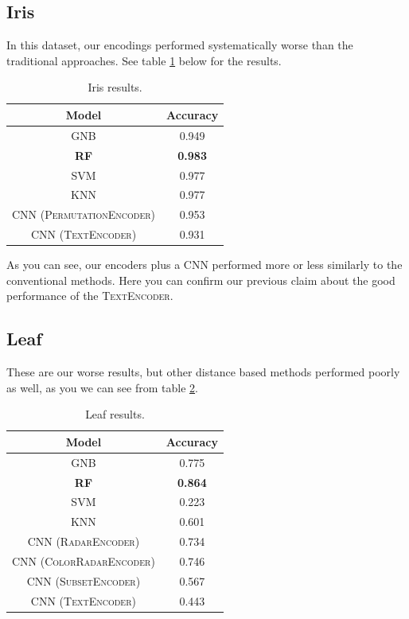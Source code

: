 \documentclass[11pt]{article}
\begin{document}
\subsection{Iris}
In this dataset, our encodings performed systematically worse than the traditional approaches. See table \ref{table:iris} below for the results.

\begin{table}[htp]
\centering
\begin{tabular}{|c|c|}
\hline
	Model & Accuracy \\ \hline
	GNB & 0.949\\
	\textbf{RF} & \textbf{0.983} \\
	SVM & 0.977\\
	KNN & 0.977\\
	CNN (\textsc{PermutationEncoder}) & 0.953 \\
	CNN (\textsc{TextEncoder}) & 0.931 \\
\hline
\end{tabular}
\caption{Iris results.}
\label{table:iris}
\end{table}

As you can see, our encoders plus a CNN performed more or less similarly to the conventional methods. Here you can confirm our previous claim about the good performance of the \textsc{TextEncoder}.

\subsection{Leaf}
These are our worse results, but other distance based methods performed poorly as  well, as you we can see from table \ref{table:leaf}.

\begin{table}[htp]
\centering
\begin{tabular}{|c|c|}
\hline
	Model & Accuracy \\ \hline
	GNB & 0.775\\
	\textbf{RF} & \textbf{0.864} \\
	SVM & 0.223\\
	KNN & 0.601 \\
	CNN (\textsc{RadarEncoder}) & 0.734 \\
	CNN (\textsc{ColorRadarEncoder}) & 0.746 \\
	CNN (\textsc{SubsetEncoder}) & 0.567 \\
	CNN (\textsc{TextEncoder}) & 0.443 \\
\hline
\end{tabular}
\caption{Leaf results.}
\label{table:leaf}
\end{table}
\end{document}
